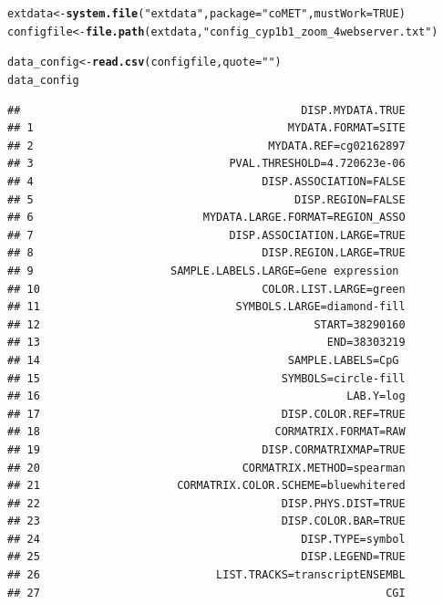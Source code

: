 \documentclass[11pt]{article}\usepackage[]{graphicx}\usepackage[usenames,dvipsnames]{color}
\makeatletter
\newcommand{\hlnum}[1]{\textcolor[rgb]{0.686,0.059,0.569}{#1}}%
\newcommand{\hlstr}[1]{\textcolor[rgb]{0.192,0.494,0.8}{#1}}%
\newcommand{\hlstd}[1]{\textcolor[rgb]{0.345,0.345,0.345}{#1}}%
\newcommand{\hlkwb}[1]{\textcolor[rgb]{0.69,0.353,0.396}{#1}}%
\newcommand{\hlkwc}[1]{\textcolor[rgb]{0.333,0.667,0.333}{#1}}%
\newcommand{\hlkwd}[1]{\textcolor[rgb]{0.737,0.353,0.396}{\textbf{#1}}}%
\newenvironment{kframe}{%
 \def\at@end@of@kframe{}%
 \ifinner\ifhmode%
  \def\at@end@of@kframe{\end{minipage}}%
  \begin{minipage}{\columnwidth}%
 \fi\fi%
 \def\FrameCommand##1{\hskip\@totalleftmargin \hskip-\fboxsep
 \colorbox{shadecolor}{##1}\hskip-\fboxsep
     \hskip-\linewidth \hskip-\@totalleftmargin \hskip\columnwidth}%
 \MakeFramed {\advance\hsize-\width
   \@totalleftmargin\z@ \linewidth\hsize
   \@setminipage}}%
 {\par\unskip\endMakeFramed%
 \at@end@of@kframe}
\newenvironment{knitrout}{}{} %
\makeatother
\begin{document}
\begin{enumerate}
\end{enumerate}

\begin{knitrout}
\color{fgcolor}\begin{kframe}
\begin{alltt}
\hlstd{extdata} \hlkwb{<-} \hlkwd{system.file}\hlstd{(}\hlstr{"extdata"}\hlstd{,} \hlkwc{package}\hlstd{=}\hlstr{"coMET"}\hlstd{,}\hlkwc{mustWork}\hlstd{=}\hlnum{TRUE}\hlstd{)}
\hlstd{configfile} \hlkwb{<-} \hlkwd{file.path}\hlstd{(extdata,} \hlstr{"config_cyp1b1_zoom_4webserver.txt"}\hlstd{)}

\hlstd{data_config} \hlkwb{<-}\hlkwd{read.csv}\hlstd{(configfile,} \hlkwc{quote} \hlstd{=} \hlstr{""}\hlstd{)}
\hlstd{data_config}
\end{alltt}
\begin{verbatim}
##                                           DISP.MYDATA.TRUE
## 1                                       MYDATA.FORMAT=SITE
## 2                                    MYDATA.REF=cg02162897
## 3                              PVAL.THRESHOLD=4.720623e-06
## 4                                   DISP.ASSOCIATION=FALSE
## 5                                        DISP.REGION=FALSE
## 6                          MYDATA.LARGE.FORMAT=REGION_ASSO
## 7                              DISP.ASSOCIATION.LARGE=TRUE
## 8                                   DISP.REGION.LARGE=TRUE
## 9                     SAMPLE.LABELS.LARGE=Gene expression 
## 10                                  COLOR.LIST.LARGE=green
## 11                              SYMBOLS.LARGE=diamond-fill
## 12                                          START=38290160
## 13                                            END=38303219
## 14                                      SAMPLE.LABELS=CpG 
## 15                                     SYMBOLS=circle-fill
## 16                                               LAB.Y=log
## 17                                     DISP.COLOR.REF=TRUE
## 18                                    CORMATRIX.FORMAT=RAW
## 19                                  DISP.CORMATRIXMAP=TRUE
## 20                               CORMATRIX.METHOD=spearman
## 21                     CORMATRIX.COLOR.SCHEME=bluewhitered
## 22                                     DISP.PHYS.DIST=TRUE
## 23                                     DISP.COLOR.BAR=TRUE
## 24                                        DISP.TYPE=symbol
## 25                                        DISP.LEGEND=TRUE
## 26                           LIST.TRACKS=transcriptENSEMBL
## 27                                                     CGI

\end{verbatim}
\end{kframe}
\end{knitrout}
\end{document}
